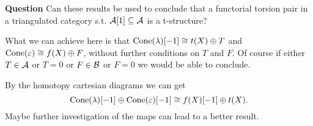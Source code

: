 \textbf{Question} Can these results be used to conclude that a functorial torsion pair in a triangulated category s.t. $\mathcal{A}[1]\subseteq \mathcal{A}$ is a t-structure?

What we can achieve here is that $\operatorname{Cone}(\lambda)[-1]\cong t(X)\oplus T$ and $\operatorname{Cone}(\varepsilon)\cong f(X)\oplus F$, without further conditions on $T$ and $F$. Of course if either $T\in\mathcal{A}$ or $T=0$ or $F\in\mathcal{B}$ or $F=0$ we would be able to conclude.

By the homotopy cartesian diagrams we can get
\[ \operatorname{Cone}(\lambda)[-1]\oplus \operatorname{Cone}(\varepsilon)[-1] \cong f(X)[-1]\oplus t(X). \]
Maybe further investigation of the maps can lead to a better result.
